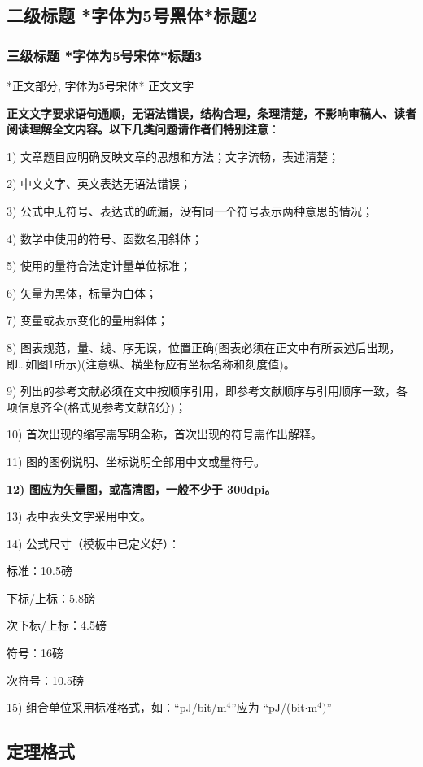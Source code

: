 \documentclass[10.5pt,compsoc,UTF8]{CjC}
\theoremstyle{mystyle}
\begin{document}
{\heiti \subsection{二级标题 *字体为5号黑体*标题2}}
\subsubsection{三级标题 *字体为5号宋体*标题3}
*正文部分, 字体为5号宋体* 正文文字

\textbf{正文文字要求语句通顺，无语法错误，结构合理，条理清楚，不影响审稿人、读者阅读理解全文内容。以下几类问题请作者们特别注意}：

1) 文章题目应明确反映文章的思想和方法；文字流畅，表述清楚；

2) 中文文字、英文表达无语法错误；

3) 公式中无符号、表达式的疏漏，没有同一个符号表示两种意思的情况；

4) 数学中使用的符号、函数名用斜体；

5) 使用的量符合法定计量单位标准；

6) 矢量为黑体，标量为白体；

7) 变量或表示变化的量用斜体；

8) 图表规范，量、线、序无误，位置正确(图表必须在正文中有所表述后出现，即{\ldots}如图1所示)(注意纵、横坐标应有坐标名称和刻度值)。

9) 列出的参考文献必须在文中按顺序引用，即参考文献顺序与引用顺序一致，各项信息齐全(格式见参考文献部分)；

10) 首次出现的缩写需写明全称，首次出现的符号需作出解释。

11) 图的图例说明、坐标说明全部用中文或量符号。

\textbf{12) 图应为矢量图，或高清图，一般不少于 300dpi。}

13) 表中表头文字采用中文。

14) 公式尺寸（模板中已定义好）：

标准：10.5磅

下标/上标：5.8磅

次下标/上标：4.5磅

符号：16磅

次符号：10.5磅

15) 组合单位采用标准格式，如：``pJ/bit/m$^{4}$''应为 ``pJ/(bit$\cdot
$m$^{4})$''

\subsection{定理格式}
\end{document}

